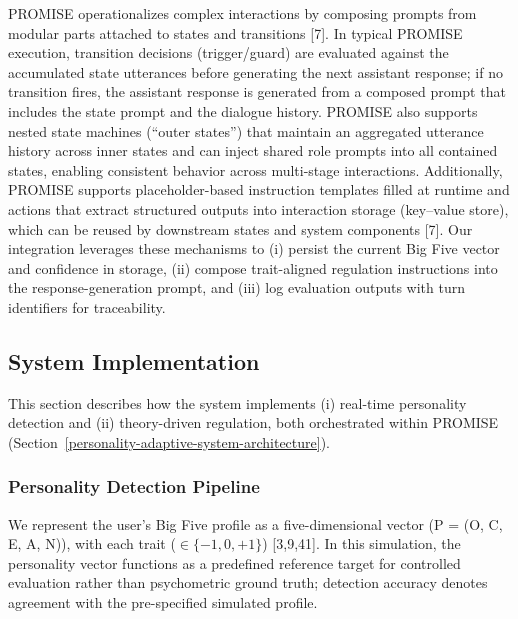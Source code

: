 \documentclass[apajournal,article,submit,moreauthors]{Definitions/mdpi}
\begin{document}
PROMISE operationalizes complex interactions by composing prompts from modular parts attached to states and transitions {[}7{]}. In typical PROMISE execution, transition decisions (trigger/guard) are evaluated against the accumulated state utterances before generating the next assistant response; if no transition fires, the assistant response is generated from a composed prompt that includes the state prompt and the dialogue history. PROMISE also supports nested state machines (``outer states'') that maintain an aggregated utterance history across inner states and can inject shared role prompts into all contained states, enabling consistent behavior across multi-stage interactions. Additionally, PROMISE supports placeholder-based instruction templates filled at runtime and actions that extract structured outputs into interaction storage (key--value store), which can be reused by downstream states and system components {[}7{]}. Our integration leverages these mechanisms to (i) persist the current Big Five vector and confidence in storage, (ii) compose trait-aligned regulation instructions into the response-generation prompt, and (iii) log evaluation outputs with turn identifiers for traceability.

\subsection{System Implementation}\label{system-implementation}

This section describes how the system implements (i) real-time personality detection and (ii) theory-driven regulation, both orchestrated within PROMISE (Section~\ref{personality-adaptive-system-architecture}).

\subsubsection{Personality Detection Pipeline}\label{personality-detection-pipeline}

We represent the user's Big Five profile as a five-dimensional vector (P = (O, C, E, A, N)), with each trait ($\in \{-1, 0, +1\}$) {[}3,9,41{]}. In this simulation, the personality vector functions as a predefined reference target for controlled evaluation rather than psychometric ground truth; detection accuracy denotes agreement with the pre-specified simulated profile.
\end{document}
